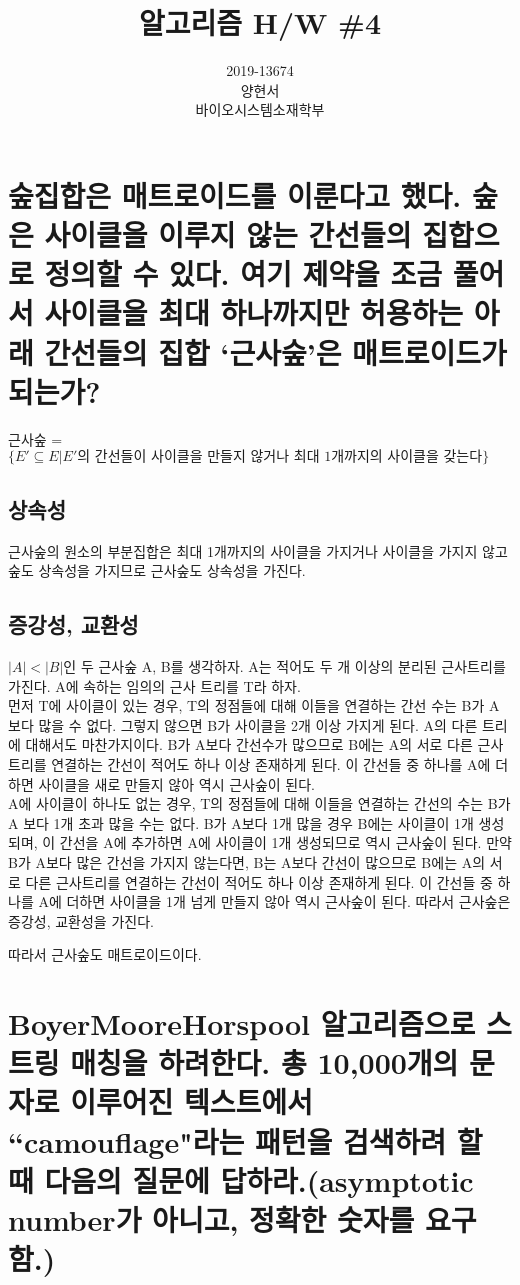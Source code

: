 \documentclass{article}
\title{알고리즘 H/W \#4}
\date{}
\author{
  2019-13674\\
  양현서 \\
  바이오시스템소재학부\\
}
\begin{document}
\maketitle


\section{숲집합은 매트로이드를 이룬다고 했다. 숲은 사이클을 이루지 않는 간선들의 집합으로 정의할 수 있다. 여기 제약을 조금 풀어서 사이클을 최대 하나까지만 허용하는 아래 간선들의 집합 ‘근사숲’은 매트로이드가 되는가?}
근사숲 = $\{E' \subseteq E | E' \text{의 간선들이 사이클을 만들지 않거나 최대 1개까지의 사이클을 갖는다}\}$

\subsection{상속성}
근사숲의 원소의 부분집합은 최대 1개까지의 사이클을 가지거나 사이클을 가지지 않고 숲도 상속성을 가지므로 근사숲도 상속성을 가진다.
\subsection{증강성, 교환성}
$|A| < |B|$인 두 근사숲 A, B를 생각하자. A는 적어도 두 개 이상의 분리된 근사트리를 가진다. A에 속하는 임의의 근사 트리를 T라 하자.
\\
먼저 T에 사이클이 있는 경우, T의 정점들에 대해 이들을 연결하는 간선 수는 B가 A보다 많을 수 없다. 그렇지 않으면 B가 사이클을 2개 이상 가지게 된다. A의 다른 트리에 대해서도 마찬가지이다. B가 A보다 간선수가 많으므로 B에는 A의 서로 다른 근사트리를 연결하는 간선이 적어도 하나 이상 존재하게 된다. 이 간선들 중 하나를 A에 더하면 사이클을 새로 만들지 않아 역시 근사숲이 된다.
\\
A에 사이클이 하나도 없는 경우, T의 정점들에 대해 이들을 연결하는 간선의 수는 B가 A 보다 1개 초과 많을 수는 없다. B가 A보다 1개 많을 경우 B에는 사이클이 1개 생성되며, 이 간선을 A에 추가하면 A에 사이클이 1개 생성되므로 역시 근사숲이 된다. 만약 B가 A보다 많은 간선을 가지지 않는다면, B는 A보다 간선이 많으므로 B에는 A의 서로 다른 근사트리를 연결하는 간선이 적어도 하나 이상 존재하게 된다. 이 간선들 중 하나를 A에 더하면 사이클을 1개 넘게 만들지 않아 역시 근사숲이 된다. 따라서 근사숲은 증강성, 교환성을 가진다.

따라서 근사숲도 매트로이드이다.

\section{BoyerMooreHorspool 알고리즘으로 스트링 매칭을 하려한다. 총 10,000개의 문자로 이루어진 텍스트에서 “camouflage"라는 패턴을 검색하려 할 때 다음의 질문에 답하라.(asymptotic number가 아니고, 정확한 숫자를 요구함.)}
\end{document}
